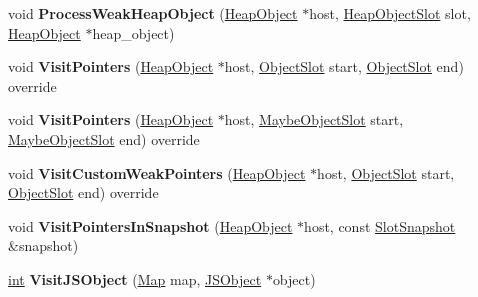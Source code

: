 \begin{DoxyCompactItemize}
void {\bfseries Process\+Weak\+Heap\+Object} (\mbox{\hyperlink{classv8_1_1internal_1_1HeapObject}{Heap\+Object}} $\ast$host, \mbox{\hyperlink{classv8_1_1internal_1_1HeapObjectSlot}{Heap\+Object\+Slot}} slot, \mbox{\hyperlink{classv8_1_1internal_1_1HeapObject}{Heap\+Object}} $\ast$heap\+\_\+object)
\item 
\mbox{\label{classv8_1_1internal_1_1ConcurrentMarkingVisitor_ab3eca5ad41128dda2af8065b6efb166a}} 
void {\bfseries Visit\+Pointers} (\mbox{\hyperlink{classv8_1_1internal_1_1HeapObject}{Heap\+Object}} $\ast$host, \mbox{\hyperlink{classv8_1_1internal_1_1ObjectSlot}{Object\+Slot}} start, \mbox{\hyperlink{classv8_1_1internal_1_1ObjectSlot}{Object\+Slot}} end) override
\item 
\mbox{\label{classv8_1_1internal_1_1ConcurrentMarkingVisitor_ae6ea74ab8ff044e25e67146f253bf80c}} 
void {\bfseries Visit\+Pointers} (\mbox{\hyperlink{classv8_1_1internal_1_1HeapObject}{Heap\+Object}} $\ast$host, \mbox{\hyperlink{classv8_1_1internal_1_1MaybeObjectSlot}{Maybe\+Object\+Slot}} start, \mbox{\hyperlink{classv8_1_1internal_1_1MaybeObjectSlot}{Maybe\+Object\+Slot}} end) override
\item 
\mbox{\label{classv8_1_1internal_1_1ConcurrentMarkingVisitor_a19e9f14554bf09f27698b6b7630328fb}} 
void {\bfseries Visit\+Custom\+Weak\+Pointers} (\mbox{\hyperlink{classv8_1_1internal_1_1HeapObject}{Heap\+Object}} $\ast$host, \mbox{\hyperlink{classv8_1_1internal_1_1ObjectSlot}{Object\+Slot}} start, \mbox{\hyperlink{classv8_1_1internal_1_1ObjectSlot}{Object\+Slot}} end) override
\item 
\mbox{\label{classv8_1_1internal_1_1ConcurrentMarkingVisitor_a35b0fa0ae8ffd86c85ffb660b2ff16b6}} 
void {\bfseries Visit\+Pointers\+In\+Snapshot} (\mbox{\hyperlink{classv8_1_1internal_1_1HeapObject}{Heap\+Object}} $\ast$host, const \mbox{\hyperlink{classv8_1_1internal_1_1SlotSnapshot}{Slot\+Snapshot}} \&snapshot)
\item 
\mbox{\label{classv8_1_1internal_1_1ConcurrentMarkingVisitor_a130a3c7a1be5b4d3d5d1cb91eba09efc}} 
\mbox{\hyperlink{classint}{int}} {\bfseries Visit\+J\+S\+Object} (\mbox{\hyperlink{classv8_1_1internal_1_1Map}{Map}} map, \mbox{\hyperlink{classv8_1_1internal_1_1JSObject}{J\+S\+Object}} $\ast$object)

\end{DoxyCompactItemize}
